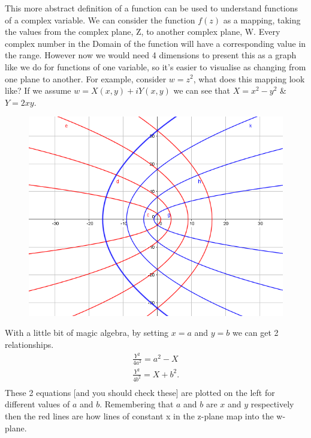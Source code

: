 This more abstract definition of a function can be used to understand functions of a complex variable.
We can consider the function $f(z)$ as a mapping, taking the values from the complex plane, Z, to another complex plane, W.
 Every complex number in the Domain of the function will have a corresponding value in the range. However now we would need 4 dimensions to present this as a graph like we do for functions of one variable, so it's easier to visualise as changing from one plane to another.
 For example, consider $w=z^2$, what does this mapping look like?
  If we assume $w=X(x,y)+iY(x,y)$ we can see that $X=x^2-y^2$ \& $Y=2xy$.
%
\begin{minipage}[t]{0.47\linewidth}
	\begin{figure}[H]
		\centering
		\includegraphics[width=\linewidth]{complex/mapping}
		\captionsetup{font=small} 	
	\end{figure} 
\end{minipage}
\hspace{0.6cm}
%
\begin{minipage}[t]{0.47\linewidth}
	\vspace{0.3cm}
	With a little bit of magic algebra, by setting $x=a$ and $y=b$ we can get 2 relationships.
	\begin{align*}
	\frac{Y^2}{4a^2}=a^2-X \\
	\frac{Y^2}{4b^2}=X+b^2. \\
	\end{align*}
These 2 equations [and you should check these] are plotted on the left for different values of $a$ and $b$.
 Remembering that $a$ and $b$ are $x$ and $y$ respectively then the red lines are how lines of constant x in the z-plane map into the w-plane.
\end{minipage}
%
%
